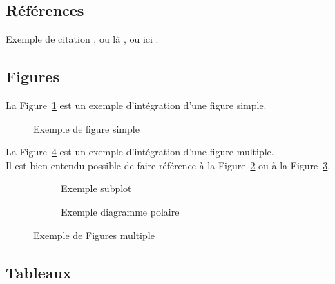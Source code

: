 \subsection{Références}

Exemple de citation \cite{Collomb2017}, ou là \cite{Collomb2018b}, ou ici \cite{Collomb2018a,Collomb2017a,Collomb2018}. \\


\FloatBarrier
\subsection{Figures}

La Figure~\ref{figure_simple} est un exemple d'intégration d'une figure simple. \\

\begin{figure}[hbtp]
	\centering
	\def\svgwidth{1\columnwidth}
	\fontsize{10pt}{10pt}\selectfont
	\caption{Exemple de figure simple}
	\label{figure_simple}
\end{figure}


La Figure~\ref{figure_multiple} est un exemple d'intégration d'une figure multiple. \\
Il est bien entendu possible de faire référence à la Figure~\ref{figure_subplot} ou à la Figure~\ref{figure_polaire}.

\begin{figure}[hbtp]
	\centering
	\begin{subfigure}[b]{0.8\textwidth}
		\centering
		\def\svgwidth{\columnwidth}
		\fontsize{10pt}{10pt}\selectfont
		\caption{Exemple subplot} 
		\label{figure_subplot}
	\end{subfigure}
	\qquad
	\begin{subfigure}[b]{0.7\textwidth}
		\centering
		\def\svgwidth{\columnwidth}
		\fontsize{10pt}{10pt}\selectfont
		\caption{Exemple diagramme polaire} 
		\label{figure_polaire}
	\end{subfigure}
	\caption{Exemple de Figures multiple} 
	\label{figure_multiple}
\end{figure}



\FloatBarrier
\subsection{Tableaux}

